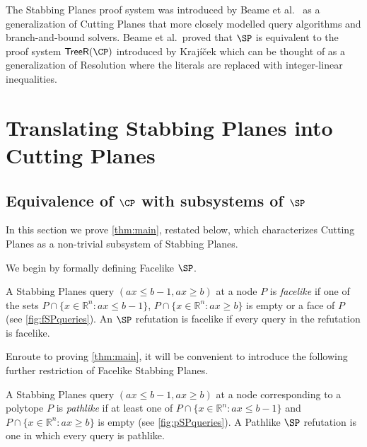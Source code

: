 \documentclass{toc}
\begin{document}
The Stabbing Planes proof system was introduced by Beame et al.~\cite{BeameFIKPPR18} as a generalization of Cutting Planes that more closely modelled query algorithms and branch-and-bound solvers.
Beame et al.~proved that $\SP$ is equivalent to the proof system $\mathsf{TreeR}(\CP)$ introduced by Kraj\'{i}\v{c}ek \cite{Krajicek98} which can be thought of as a generalization of Resolution where the literals are replaced with integer-linear inequalities.






\section{Translating Stabbing Planes into Cutting Planes} 
\label{sec:SP}

\subsection{Equivalence of \texorpdfstring{$\CP$}{CP} with subsystems of
  \texorpdfstring{$\SP$}{SP}}
\label{sec:facelikesp-sim}

In this section we prove \autoref{thm:main}, restated below, which characterizes Cutting Planes as a non-trivial subsystem of Stabbing Planes.

\main*

We begin by formally defining Facelike $\SP$.
\begin{definition}
	A Stabbing Planes query $(ax \leq b-1, ax \geq b)$ at a node $P$ is \emph{facelike} if one of the sets $P \cap \{x \in \mathbb{R}^n: ax \leq b-1\}$, $P \cap \{x \in \mathbb{R}^n: ax \geq b\}$ is empty or a face of $P$ (see \autoref{fig:fSPqueries}).
	An $\SP$ refutation is facelike if every query in the refutation is facelike. 
\end{definition}

Enroute to proving \autoref{thm:main}, it will be convenient to introduce the following further restriction of Facelike Stabbing Planes.

\begin{definition}
	A Stabbing Planes query $(ax \leq b-1, ax \geq b)$ at a node corresponding to a polytope $P$ is \emph{pathlike} if at least one of $P \cap \{x \in \mathbb{R}^n: ax \leq b-1\}$ and $P \cap \{x \in \mathbb{R}^n: ax \geq b\}$ is empty (see \autoref{fig:pSPqueries}). A Pathlike $\SP$ refutation is one in which every query is pathlike. 
\end{definition}
\end{document}
